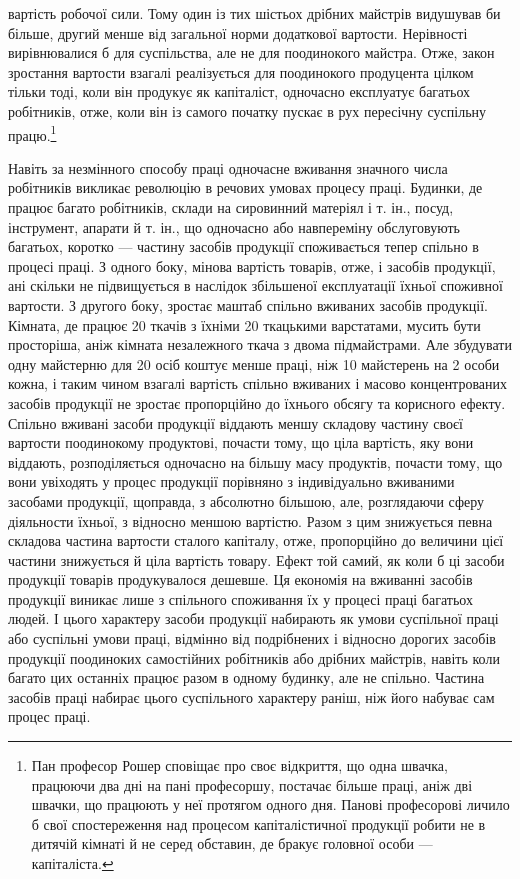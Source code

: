 \parcont{}  %
вартість робочої сили. Тому один із тих шістьох дрібних майстрів
видушував би більше, другий менше від загальної норми додаткової
вартости. Нерівності вирівнювалися б для суспільства, але
не для поодинокого майстра. Отже, закон зростання вартости
взагалі реалізується для поодинокого продуцента цілком тільки
тоді, коли він продукує як капіталіст, одночасно експлуатує
багатьох робітників, отже, коли він із самого початку пускає в
рух пересічну суспільну працю.\footnote{
Пан професор Рошер сповіщає про своє відкриття, що одна швачка,
працюючи два дні на пані професоршу, постачає більше праці, аніж дві
швачки, що працюють у неї протягом одного дня. Панові професорові
личило б свої спостереження над процесом капіталістичної продукції
робити не в дитячій кімнаті й не серед обставин, де бракує головної особи —
капіталіста.
}

Навіть за незмінного способу праці одночасне вживання
значного числа робітників викликає революцію в речових умовах
процесу праці. Будинки, де працює багато робітників, склади
на сировинний матеріял і т. ін., посуд, інструмент, апарати й т. ін.,
що одночасно або навпереміну обслуговують багатьох, коротко —
частину засобів продукції споживається тепер спільно в процесі
праці. З одного боку, мінова вартість товарів, отже, і засобів
продукції, ані скільки не підвищується в наслідок збільшеної
експлуатації їхньої споживної вартости. З другого боку,
зростає маштаб спільно вживаних засобів продукції. Кімната,
де працює 20 ткачів з їхніми 20 ткацькими варстатами, мусить
бути просторіша, аніж кімната незалежного ткача з двома підмайстрами.
Але збудувати одну майстерню для 20 осіб коштує
менше праці, ніж 10 майстерень на 2 особи кожна, і таким чином
взагалі вартість спільно вживаних і масово концентрованих засобів
продукції не зростає пропорційно до їхнього обсягу та корисного
ефекту. Спільно вживані засоби продукції віддають меншу
складову частину своєї вартости поодинокому продуктові, почасти
тому, що ціла вартість, яку вони віддають, розподіляється
одночасно на більшу масу продуктів, почасти тому, що вони увіходять
у процес продукції порівняно з індивідуально вживаними
засобами продукції, щоправда, з абсолютно більшою, але, розглядаючи
сферу діяльности їхньої, з відносно меншою вартістю.
Разом з цим знижується певна складова частина вартости сталого
капіталу, отже, пропорційно до величини цієї частини знижується
й ціла вартість товару. Ефект той самий, як коли б ці засоби
продукції товарів продукувалося дешевше. Ця економія на вживанні
засобів продукції виникає лише з спільного споживання
їх у процесі праці багатьох людей. І цього характеру засоби продукції
набирають як умови суспільної праці або суспільні умови
праці, відмінно від подрібнених і відносно дорогих засобів продукції
поодиноких самостійних робітників або дрібних майстрів,
навіть коли багато цих останніх працює разом в одному будинку,
але не спільно. Частина засобів праці набирає цього суспільного
характеру раніш, ніж його набуває сам процес праці.
